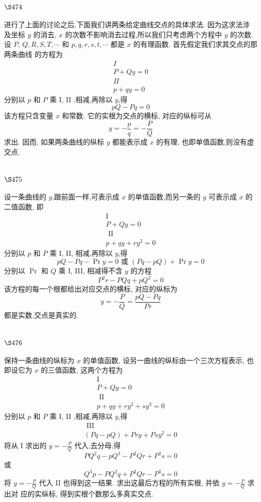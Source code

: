 \section{$\S 474$}

进行了上面的讨论之后,下面我们讲两条给定曲线交点的具体求法. 因为这求法涉 及坐标 $y$ 的消去, $x$ 的次数不影响消去过程,所以我们只考虑两个方程中 $y$ 的次数. 设 $P$, $Q, R, S, T, \cdots$ 和 $p, q, r, s, t, \cdots$ 都是 $x$ 的有理函数. 首先假定我们求其交点的那两条曲线 的方程为
\[
\begin{gathered}
I \\
P+Q y=0 \\
\Pi \\
p+q y=0
\end{gathered}
\]
分别以 $p$ 和 $P$ 乘 I, II ,相减,再除以 $y$,得
\[
p Q-P q=0
\]
该方程只含变量 $x$ 和常数. 它的实根为交点的横标, 对应的纵标可从
\[
y=-\frac{p}{q}=-\frac{P}{Q}
\]
求出. 因而, 如果两条曲线的纵标 $y$ 都能表示成 $x$ 的有理, 也即单值函数,则没有虚交点.

\section{$\S 475$}

设一条曲线的 $y$,跟前面一样,可表示成 $x$ 的单值函数,而另一条的 $y$ 可表示成 $x$ 的 二值函数, 即
\[
\begin{gathered}
\mathrm{I} \\
P+Q y=0 \\
\text { II } \\
p+q y+r y^{2}=0
\end{gathered}
\]
分别以 $p$ 和 $P$ 乘 I, II, 相减,再除以 $y$,得
\[
p Q-P q-\operatorname{Pr} y=0 \text { 或 }(P q-p Q)+\operatorname{Pr} y=0
\]
分别以 $\operatorname{Pr}$ 和 $Q$ 乘 I, III, 相减得不含 $y$ 的方程
\[
P^{2} r-P Q q+p Q^{2}=0
\]
该方程的每一个根都给出对应交点的横标, 对应的纵标为
\[
y=-\frac{P}{Q}=\frac{p Q-P q}{P r}
\]
都是实数,交点是真实的.

\section{$\S 476$}

保持一条曲线的纵标为 $x$ 的单值函数, 设另一曲线的纵标由一个三次方程表示, 也 即设它为 $x$ 的三值函数, 这两个方程为
\[
\begin{gathered}
\mathrm{I} \\
P+Q y=0 \\
\text { II } \\
p+q y+r y^{2}+s y^{3}=0
\end{gathered}
\]
分别以 $p$ 和 $P$ 乘 I, II ,相减,再除以 $y$,得
\[
\begin{gathered}
\text { III } \\
(P q-p Q)+P r y+P s y^{2}=0
\end{gathered}
\]
将从 I 求出的 $y=-\frac{P}{Q}$ 代入,去分母,得
\[
P Q^{2} q-p Q^{3}-P^{2} Q r+P^{3} s=0
\]
或
\[
Q^{3} p-P Q^{2} q+P^{2} Q r-P^{3} s=0
\]
将 $y=-\frac{P}{Q}$ 代入 II 也得到这一结果. 求出这最后方程的所有实根, 并依 $y=-\frac{P}{Q}$ 求出对 应的实纵标, 得到实根个数那么多真实交点.

